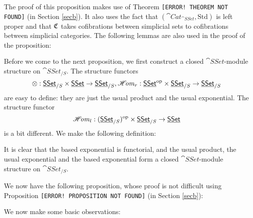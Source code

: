 The proof of this proposition makes use of Theorem {\color{FF0000}\texttt{[ERROR! THEOREM NOT FOUND]}} (in Section \ref{secb}).
It also uses the fact that $(\cat{Cat}_{\cat{SSet}},\text{Std})$ is left proper and that
$\mathfrak{C}$ takes cofibrations between simplicial sets to cofibrations between simplicial categories.
The following lemmas are also used in the proof of the proposition:



Before we come to the next proposition, we first construct a closed $\cat{SSet}$-module structure on $\cat{SSet}_{/S}$. 
The structure functors $$\otimes:\underline{\smash{\mathsf{SSet}}}_{/S}\times\underline{\smash{\mathsf{SSet}}}\to\underline{\smash{\mathsf{SSet}}}_{/S},\operatorname{\mathscr{H}\mkern-3mu\mathit{om}}_r:\underline{\smash{\mathsf{SSet}}}^{\mathrm{op}}\times\underline{\smash{\mathsf{SSet}}}_{/S}\to\underline{\smash{\mathsf{SSet}}}_{/S}$$
are easy to define: they are just the usual product and the usual exponential. The structure functor
$$\operatorname{\mathscr{H}\mkern-3mu\mathit{om}}_l:(\underline{\smash{\mathsf{SSet}}}_{/S})^{\mathrm{op}}\times\underline{\smash{\mathsf{SSet}}}_{/S}\to\underline{\smash{\mathsf{SSet}}}$$ is a bit different. We make the following definition:


It is clear that the based exponential is functorial, and the usual product, the usual exponential and the based exponential
form a closed $\cat{SSet}$-module structure on $\cat{SSet}_{/S}$. 

We now have the following proposition, whose proof is not difficult using Proposition 
{\color{FF0000}\texttt{[ERROR! PROPOSITION NOT FOUND]}} (in Section \ref{secb}):


We now make some basic observations:


